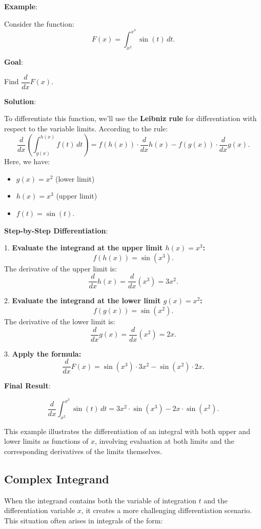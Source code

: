 \documentclass[a4paper,12pt]{book}
\begin{document}
\textbf{Example}:

Consider the function:
\[
F(x) = \int_{x^2}^{x^3} \sin(t) \, dt.
\]

\textbf{Goal}:

Find \(\dfrac{d}{dx} F(x)\).

\textbf{Solution}:

To differentiate this function, we'll use the \textbf{Leibniz rule} for differentiation with respect to the variable limits. According to the rule:
\[
\dfrac{d}{dx} \left( \int_{g(x)}^{h(x)} f(t) \, dt \right) = f(h(x)) \cdot \dfrac{d}{dx}h(x) - f(g(x)) \cdot \dfrac{d}{dx}g(x).
\]
Here, we have:

\begin{itemize}
\item
\(g(x) = x^2\) (lower limit)
\item
\(h(x) = x^3\) (upper limit)
\item
\(f(t) = \sin(t)\).
\end{itemize}

\textbf{Step-by-Step Differentiation}:

1. \textbf{Evaluate the integrand at the upper limit \(h(x) = x^3\):}
   \[
   f(h(x)) = \sin(x^3).
   \]
   The derivative of the upper limit is:
   \[
   \dfrac{d}{dx}h(x) = \dfrac{d}{dx}(x^3) = 3x^2.
   \]

2. \textbf{Evaluate the integrand at the lower limit \(g(x) = x^2\):}
   \[
   f(g(x)) = \sin(x^2).
   \]
   The derivative of the lower limit is:
   \[
   \dfrac{d}{dx}g(x) = \dfrac{d}{dx}(x^2) = 2x.
   \]

3. \textbf{Apply the formula:}
   \[
   \dfrac{d}{dx} F(x) = \sin(x^3) \cdot 3x^2 - \sin(x^2) \cdot 2x.
   \]

\textbf{Final Result}:

\[
\dfrac{d}{dx} \int_{x^2}^{x^3} \sin(t) \, dt = 3x^2 \cdot \sin(x^3) - 2x \cdot \sin(x^2).
\]

This example illustrates the differentiation of an integral with both upper and lower limits as functions of \(x\), involving evaluation at both limits and the corresponding derivatives of the limits themselves.

\subsection{Complex Integrand}

When the integrand contains both the variable of integration \(t\) and the differentiation variable \(x\), it creates a more challenging differentiation scenario. This situation often arises in integrals of the form:
\end{document}
